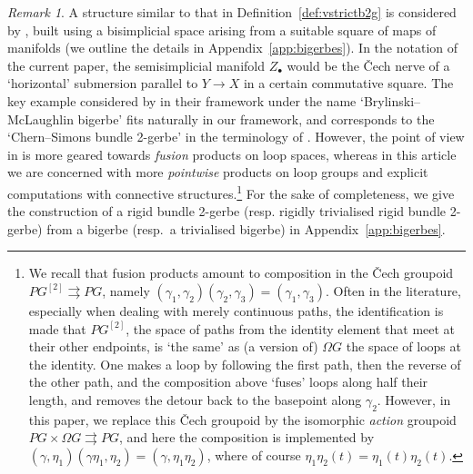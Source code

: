 \documentclass[12pt]{amsart}
\theoremstyle{plain}
\theoremstyle{definition}
\theoremstyle{remark}
\newtheorem{remark}[theorem]{Remark}
\numberwithin{equation}{section}
\newcommand{\<}{\langle}
\renewcommand{\>}{\rangle}
\begin{document}
\begin{remark}
A structure similar to that in Definition~\ref{def:vstrictb2g} is considered by \cite{KM19}, built using a bisimplicial space arising from a suitable square of maps of manifolds (we outline the details in Appendix~\ref{app:bigerbes}). 
In the notation of the current paper, the semisimplicial manifold $Z_\bullet$ would be the \v{C}ech nerve of a `horizontal' submersion parallel to $Y\to X$ in a certain commutative square. 
The key example considered by \cite{KM19} in their framework under the name `Brylinski--McLaughlin bigerbe' fits naturally in our framework, and corresponds to the `Chern--Simons bundle 2-gerbe' in the terminology of \cite{CJMSW}.
However, the point of view in \cite{KM19} is more geared towards \emph{fusion} products on loop spaces, whereas in this article we are concerned with more \emph{pointwise} products on loop groups and explicit computations with connective structures.\footnote{We recall that fusion products amount to composition in the \v{C}ech groupoid $PG^{[2]} \rightrightarrows PG$, namely $(\gamma_1,\gamma_2)(\gamma_2,\gamma_3) = (\gamma_1,\gamma_3)$. 
Often in the literature, especially when dealing with merely continuous paths, the identification is made that $PG^{[2]}$, the space of paths from the identity element that meet at their other endpoints, is `the same' as (a version of) $\Omega G$ the space of loops at the identity.
One makes a loop by following the first path, then the reverse of the other path, and the composition above `fuses' loops along half their length, and removes the detour back to the basepoint along $\gamma_2$.
However, in this paper, we replace this \v{C}ech groupoid by the isomorphic \emph{action} groupoid $PG\times \Omega G \rightrightarrows PG$, and here the composition is implemented by $(\gamma, \eta_1)(\gamma\eta_1,\eta_2) = (\gamma,\eta_1\eta_2)$, where of course $\eta_1\eta_2(t) = \eta_1(t)\eta_2(t)$.}
For the sake of completeness, we give the construction of a rigid bundle 2-gerbe (resp. rigidly trivialised rigid bundle 2-gerbe) from a bigerbe (resp.\ a trivialised bigerbe) in Appendix~\ref{app:bigerbes}.
\end{remark}
\end{document}
